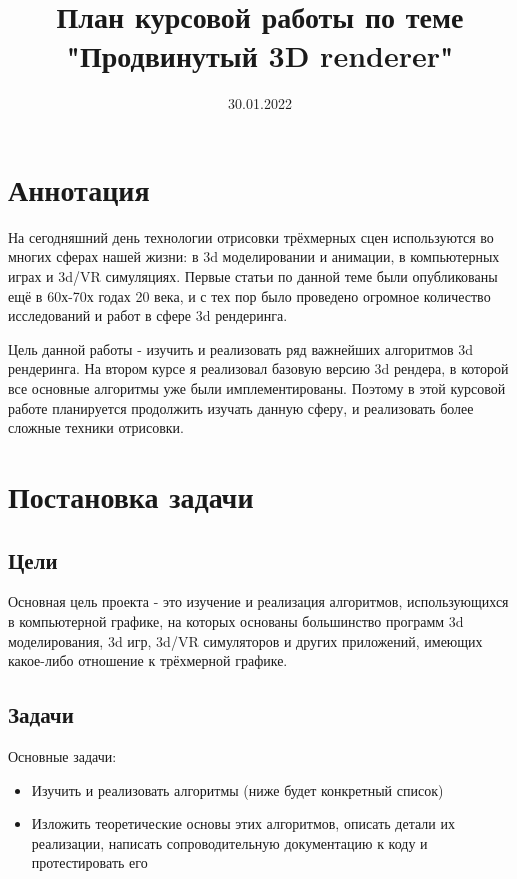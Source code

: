 \documentclass[12pt]{article}
\begin{document}

\title{План курсовой работы по теме "Продвинутый 3D renderer"}
\date{30.01.2022}
\maketitle

\tableofcontents

\pagebreak

\section{Аннотация}
На сегодняшний день технологии отрисовки трёхмерных сцен используются во многих сферах нашей жизни: в 3d моделировании и анимации, в компьютерных играх и 3d/VR симуляциях. Первые статьи по данной теме были опубликованы ещё в 60х-70х годах 20 века, и с тех пор было проведено огромное количество исследований и работ в сфере 3d рендеринга. 

Цель данной работы - изучить и реализовать ряд важнейших алгоритмов 3d рендеринга. На втором курсе я реализовал базовую версию 3d рендера, в которой все основные алгоритмы уже были имплементированы. Поэтому в этой курсовой работе планируется продолжить изучать данную сферу, и реализовать более сложные техники отрисовки.

\section{Постановка задачи}
\subsection{Цели}
Основная цель проекта - это изучение и реализация алгоритмов, использующихся в компьютерной графике, на которых основаны большинство программ 3d моделирования, 3d игр, 3d/VR симуляторов и других приложений, имеющих какое-либо отношение к трёхмерной графике. 
\subsection{Задачи}
Основные задачи:
\begin{itemize}
	\item Изучить и реализовать алгоритмы (ниже будет конкретный список)
	\item Изложить теоретические основы этих алгоритмов, описать детали их реализации, написать сопроводительную документацию к коду и протестировать его
\end{itemize}
\end{document}
